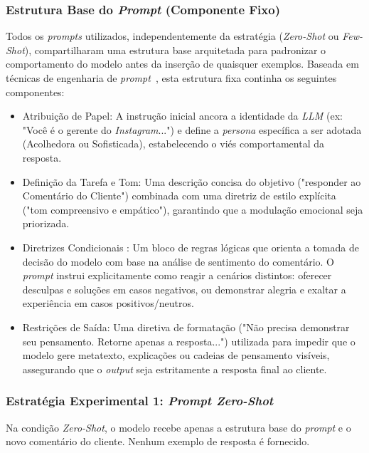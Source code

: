 \documentclass[12pt, a4paper]{article}
\numberwithin{equation}{section}
\begin{document}
\subsubsection{Estrutura Base do \textit{Prompt} (Componente Fixo)}

Todos os \textit{prompts} utilizados, independentemente da estratégia (\textit{Zero-Shot} ou \textit{Few-Shot}), compartilharam uma estrutura base arquitetada para padronizar o comportamento do modelo antes da inserção de quaisquer exemplos. Baseada em técnicas de engenharia de \textit{prompt}~\cite{Mesko2023Prompt}, esta estrutura fixa continha os seguintes componentes:

\begin{itemize}
 \item Atribuição de Papel: A instrução inicial ancora a identidade da \textit{LLM} (ex: "Você é o gerente do \textit{Instagram}...") e define a \textit{persona} específica a ser adotada (Acolhedora ou Sofisticada), estabelecendo o viés comportamental da resposta.

 \item Definição da Tarefa e Tom: Uma descrição concisa do objetivo ("responder ao Comentário do Cliente") combinada com uma diretriz de estilo explícita ("tom compreensivo e empático"), garantindo que a modulação emocional seja priorizada.

\item Diretrizes Condicionais : Um bloco de regras lógicas que orienta a tomada de decisão do modelo com base na análise de sentimento do comentário. O \textit{prompt} instrui explicitamente como reagir a cenários distintos: oferecer desculpas e soluções em casos negativos, ou demonstrar alegria e exaltar a experiência em casos positivos/neutros.

 \item Restrições de Saída: Uma diretiva de formatação ("Não precisa demonstrar seu pensamento. Retorne apenas a resposta...") utilizada para impedir que o modelo gere metatexto, explicações ou cadeias de pensamento visíveis, assegurando que o \textit{output} seja estritamente a resposta final ao cliente.
\end{itemize}

\subsubsection{Estratégia Experimental 1: \textit{Prompt Zero-Shot}}

Na condição \textit{Zero-Shot}, o modelo recebe apenas a estrutura base do \textit{prompt} e o novo comentário do cliente. Nenhum exemplo de resposta é fornecido.
\end{document}
